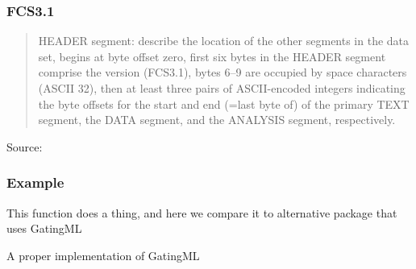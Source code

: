\documentclass{beamer}
\begin{document}
\begin{frame}
  \frametitle{FCS3.1}
  \begin{quotation}
    HEADER segment: describe the location of the other segments in the
    data set, begins at byte offset zero, first six bytes in the HEADER
    segment comprise the version (FCS3.1), bytes 6--9 are occupied by
    space characters (ASCII 32), then at least three pairs of
    ASCII-encoded integers indicating the byte offsets for the start and
    end (=last byte of) of the primary TEXT segment, the DATA segment,
    and the ANALYSIS segment, respectively.
  \end{quotation}
  Source: \cite{parks2008data}
\end{frame}

\begin{frame}[fragile]
  \frametitle{Example}

  This function does a thing, and here we compare
  it to alternative package that uses GatingML
  
    A proper implementation of GatingML
\end{frame}

\nocite{*}


\end{document}
